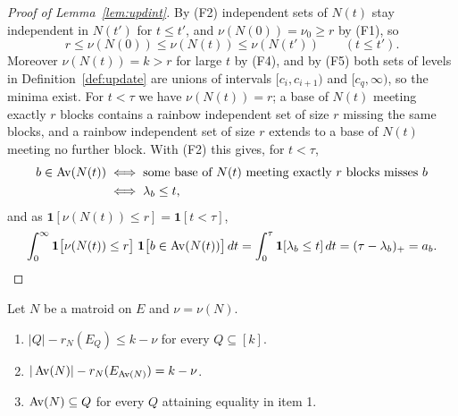 \begin{proof}[Proof of Lemma~\ref{lem:updint}]
By (F2) independent sets of $N(t)$ stay independent in $N(t')$ for $t\le t'$, and
$\nu(N(0))=\nu_0\ge r$ by (F1), so
\[
  r\le\nu(N(0))\le\nu(N(t))\le\nu(N(t'))\qquad(t\le t').
\]
Moreover $\nu(N(t))=k>r$ for large $t$ by (F4), and by (F5) both sets of levels in
Definition~\ref{def:update} are unions of intervals $[c_i,c_{i+1})$ and
$[c_q,\infty)$, so the minima exist.  For $t<\tau$ we have $\nu(N(t))=r$; a base of
$N(t)$ meeting exactly $r$ blocks contains a rainbow independent set of size $r$
missing the same blocks, and a rainbow independent set of size $r$ extends to a
base of $N(t)$ meeting no further block.  With (F2) this gives, for $t<\tau$,
\[
  \begin{aligned}
  b\in\operatorname{Av}(N(t))&\iff\text{some base of }N(t)\text{ meeting exactly }r\text{ blocks misses }b\\
  &\iff\lambda_b\le t,
  \end{aligned}
\]
and as $\mathbf 1[\nu(N(t))\le r]=\mathbf 1[t<\tau]$,
\[
  \int_0^{\infty}\mathbf 1\bigl[\nu(N(t))\le r\bigr]\;\mathbf 1\bigl[b\in\operatorname{Av}(N(t))\bigr]\,dt
  =\int_0^{\tau}\mathbf 1[\lambda_b\le t]\,dt=(\tau-\lambda_b)_+=a_b.\qedhere
\]
\end{proof}

\begin{lemma}
\label{lem:avoidable}
Let $N$ be a matroid on $E$ and $\nu=\nu(N)$.
\begin{enumerate}
  \item $|Q|-r_N(E_Q)\le k-\nu$ for every $Q\subseteq[k]$.
  \item $|\operatorname{Av}(N)|-r_N(E_{\operatorname{Av}(N)})=k-\nu$.
  \item $\operatorname{Av}(N)\subseteq Q$ for every $Q$ attaining equality in item 1.
\end{enumerate}
\end{lemma}

